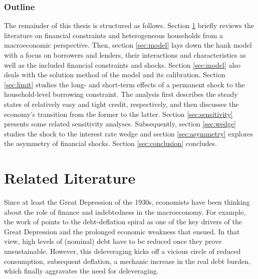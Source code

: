 \documentclass[a4paper,12pt]{article} %
\numberwithin{equation}{section} %
\numberwithin{figure}{section}
\numberwithin{table}{section}
\begin{document}
\subsubsection*{Outline}
\label{sec:outline}
The remainder of this thesis is structured as follows. Section \ref{sec:literature} briefly reviews the literature on financial constraints and heterogeneous households from a macroeconomic perspective. Then, section \ref{sec:model} lays down the \Gls{hank} model with a focus on borrowers and lenders, their interactions and characteristics as well as the included financial constraints and shocks. Section \ref{sec:model} also deals with the solution method of the model and its calibration. Section \ref{sec:limit} studies the long- and short-term effects of a permanent shock to the household-level borrowing constraint. The analysis first describes the steady states of relatively easy and tight credit, respectively, and then discusses the economy's transition from the former to the latter. Section \ref{sec:sensitivity} presents some related sensitivity analyses. Subsequently, section \ref{sec:wedge} studies the shock to the interest rate wedge and section \ref{sec:asymmetry} explores the asymmetry of financial shocks. Section \ref{sec:conclusion} concludes.

\section{Related Literature}
\label{sec:literature}

Since at least the Great Depression of the 1930s, economists have been thinking about the role of finance and indebtedness in the macroeconomy. For example, the work of \textcite{fisher1933} points to the debt-deflation spiral as one of the key drivers of the Great Depression and the prolonged economic weakness that ensued. In that view, high levels of (nominal) debt have to be reduced once they prove unsustainable. However, this deleveraging kicks off a vicious circle of reduced consumption, subsequent deflation, a mechanic increase in the real debt burden, which finally aggravates the need for deleveraging.
\end{document}
